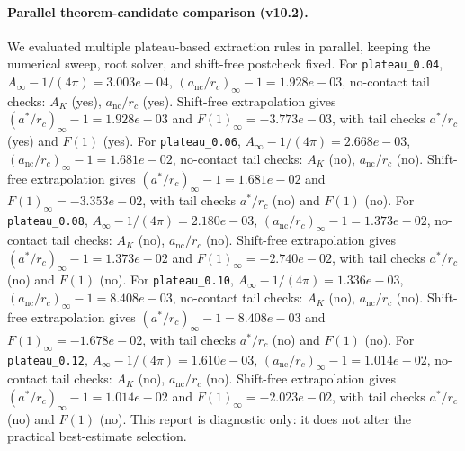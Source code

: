 \paragraph{Parallel theorem-candidate comparison (v10.2).}
We evaluated multiple plateau-based extraction rules in parallel, keeping the numerical sweep, root solver, and shift-free postcheck fixed. For \texttt{plateau_0.04}, $A_\infty-1/(4\pi)=3.003e-04$, $(a_{\mathrm{nc}}/r_c)_\infty-1=1.928e-03$, no-contact tail checks: $A_K$ (yes), $a_{\mathrm{nc}}/r_c$ (yes). Shift-free extrapolation gives $(a^*/r_c)_\infty-1=1.928e-03$ and $F(1)_\infty=-3.773e-03$, with tail checks $a^*/r_c$ (yes) and $F(1)$ (yes). For \texttt{plateau_0.06}, $A_\infty-1/(4\pi)=2.668e-03$, $(a_{\mathrm{nc}}/r_c)_\infty-1=1.681e-02$, no-contact tail checks: $A_K$ (no), $a_{\mathrm{nc}}/r_c$ (no). Shift-free extrapolation gives $(a^*/r_c)_\infty-1=1.681e-02$ and $F(1)_\infty=-3.353e-02$, with tail checks $a^*/r_c$ (no) and $F(1)$ (no). For \texttt{plateau_0.08}, $A_\infty-1/(4\pi)=2.180e-03$, $(a_{\mathrm{nc}}/r_c)_\infty-1=1.373e-02$, no-contact tail checks: $A_K$ (no), $a_{\mathrm{nc}}/r_c$ (no). Shift-free extrapolation gives $(a^*/r_c)_\infty-1=1.373e-02$ and $F(1)_\infty=-2.740e-02$, with tail checks $a^*/r_c$ (no) and $F(1)$ (no). For \texttt{plateau_0.10}, $A_\infty-1/(4\pi)=1.336e-03$, $(a_{\mathrm{nc}}/r_c)_\infty-1=8.408e-03$, no-contact tail checks: $A_K$ (no), $a_{\mathrm{nc}}/r_c$ (no). Shift-free extrapolation gives $(a^*/r_c)_\infty-1=8.408e-03$ and $F(1)_\infty=-1.678e-02$, with tail checks $a^*/r_c$ (no) and $F(1)$ (no). For \texttt{plateau_0.12}, $A_\infty-1/(4\pi)=1.610e-03$, $(a_{\mathrm{nc}}/r_c)_\infty-1=1.014e-02$, no-contact tail checks: $A_K$ (no), $a_{\mathrm{nc}}/r_c$ (no). Shift-free extrapolation gives $(a^*/r_c)_\infty-1=1.014e-02$ and $F(1)_\infty=-2.023e-02$, with tail checks $a^*/r_c$ (no) and $F(1)$ (no). This report is diagnostic only: it does not alter the practical best-estimate selection.

